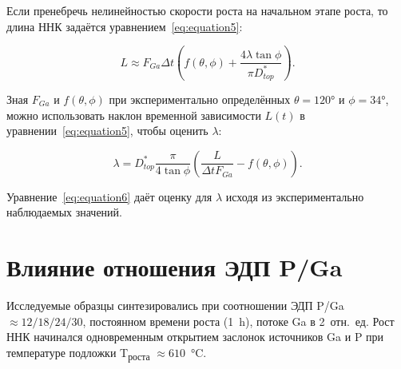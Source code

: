 Если пренебречь нелинейностью скорости роста на начальном этапе роста, то длина ННК задаётся
уравнением~\ref{eq:equation5}:

\begin{equation} \label{eq:equation5} L\approx F_{Ga} \Delta t \left(
	f(\theta,\phi) + \frac{4 \lambda \tan{\phi}}{\pi D_{top}^\ast} \right).
\end{equation}

Зная \(F_ {Ga}\) и \(f(\theta,\phi)\) при экспериментально определённых
\(\theta = 120\si{\degree}\) и \(\phi = 34\si{\degree}\), можно использовать
наклон временной зависимости \(L(t)\) в уравнении~\ref{eq:equation5}, чтобы
оценить \(\lambda\):

\begin{equation} \label{eq:equation6} \lambda=D_{top}^\ast
	\frac{\pi}{4\tan{\phi}} \left( \frac{L}{\Delta t F_{Ga}}-f(\theta,\phi)
\right).  \end{equation}

Уравнение~\ref{eq:equation6} даёт оценку для \(\lambda\) исходя из
экспериментально наблюдаемых значений.

\section{Влияние отношения ЭДП P/Ga}\label{sec:ch5/sec4}


Исследуемые образцы синтезировались при соотношении ЭДП P/Ga \(\approx
12/18/24/30\), постоянном времени роста (1~\si{\hour}), потоке Ga в 2~отн.~ед.
Рост ННК начинался одновременным открытием заслонок источников Ga и P при
температуре подложки T\textsubscript{роста} \(\approx
610\)~\si{\degreeCelsius}.

